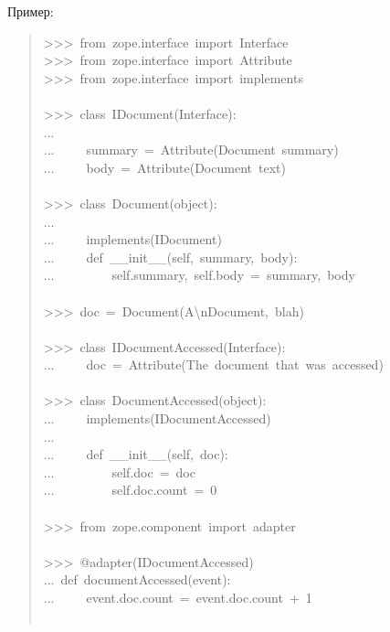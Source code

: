 \documentclass[14pt,a4paper,openany,twoside,final]{extbook}
\begin{document}
Пример:

\begin{quote}{\ttfamily \raggedright \noindent
>{}>{}>~from~zope.interface~import~Interface\\
>{}>{}>~from~zope.interface~import~Attribute\\
>{}>{}>~from~zope.interface~import~implements\\
~\\
>{}>{}>~class~IDocument(Interface):\\
...\\
...~~~~~summary~=~Attribute(\textquotedbl{}Document~summary\textquotedbl{})\\
...~~~~~body~=~Attribute(\textquotedbl{}Document~text\textquotedbl{})\\
~\\
>{}>{}>~class~Document(object):\\
...\\
...~~~~~implements(IDocument)\\
...~~~~~def~\_\_init\_\_(self,~summary,~body):\\
...~~~~~~~~~self.summary,~self.body~=~summary,~body\\
~\\
>{}>{}>~doc~=~Document(\textquotedbl{}A\textbackslash{}nDocument\textquotedbl{},~\textquotedbl{}blah\textquotedbl{})\\
~\\
>{}>{}>~class~IDocumentAccessed(Interface):\\
...~~~~~doc~=~Attribute(\textquotedbl{}The~document~that~was~accessed\textquotedbl{})\\
~\\
>{}>{}>~class~DocumentAccessed(object):\\
...~~~~~implements(IDocumentAccessed)\\
...\\
...~~~~~def~\_\_init\_\_(self,~doc):\\
...~~~~~~~~~self.doc~=~doc\\
...~~~~~~~~~self.doc.count~=~0\\
~\\
>{}>{}>~from~zope.component~import~adapter\\
~\\
>{}>{}>~@adapter(IDocumentAccessed)\\
...~def~documentAccessed(event):\\
...~~~~~event.doc.count~=~event.doc.count~+~1\\
~\\
}
\end{quote}
\end{document}
